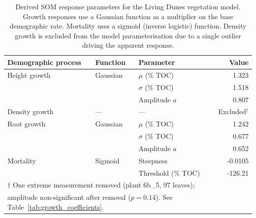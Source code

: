 \begin{table}[htbp]
\centering
\caption{Derived SOM response parameters for the Living Dunes vegetation model. Growth responses use a Gaussian function as a multiplier on the base demographic rate. Mortality uses a sigmoid (inverse logistic) function. Density growth is excluded from the model parameterisation due to a single outlier driving the apparent response.}
\label{tab:som_derived_parameters}
\begin{tabular}{l l l r}
\toprule
Demographic process & Function & Parameter & Value \\
\midrule
Height growth & Gaussian & $\mu$ (\% TOC) & 1.323 \\
              &          & $\sigma$ (\% TOC) & 1.518 \\
              &          & Amplitude $a$ & 0.807 \\
\midrule
Density growth & --- & --- & Excluded$^\dagger$ \\
\midrule
Root growth & Gaussian & $\mu$ (\% TOC) & 1.242 \\
            &          & $\sigma$ (\% TOC) & 0.677 \\
            &          & Amplitude $a$ & 0.652 \\
\midrule
Mortality & Sigmoid & Steepness & -0.0105 \\
          &         & Threshold (\% TOC) & -126.21 \\
\bottomrule
\multicolumn{4}{l}{\footnotesize $\dagger$ One extreme measurement removed (plant 6b\_5, 97 leaves);} \\
\multicolumn{4}{l}{\footnotesize amplitude non-significant after removal ($p = 0.14$). See Table~\ref{tab:growth_coefficients}.} \\
\end{tabular}
\end{table}
